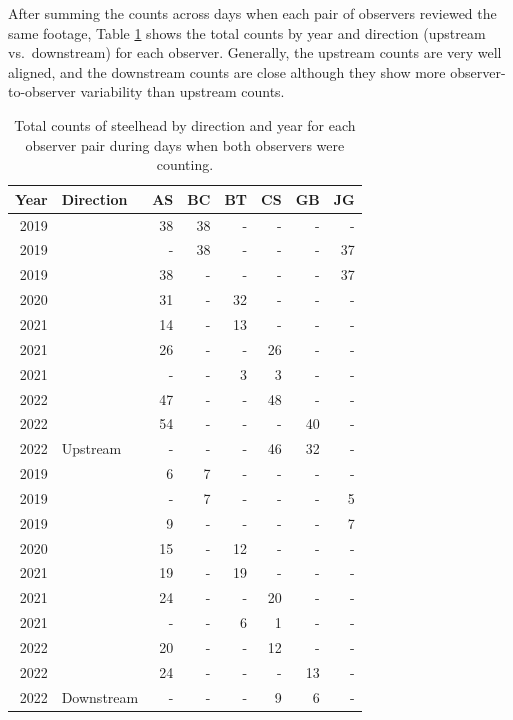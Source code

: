 \documentclass[
]{article}
\begin{document}
After summing the counts across days when each pair of observers reviewed the same footage, Table \ref{tab:obs-totals} shows the total counts by year and direction (upstream vs.~downstream) for each observer. Generally, the upstream counts are very well aligned, and the downstream counts are close although they show more observer-to-observer variability than upstream counts.

\begin{table}[!h]

\caption{\label{tab:obs-totals}Total counts of steelhead by direction and year for each observer pair during days when both observers were counting.}
\centering
\begin{tabular}[t]{rlrrrrrr}
\toprule
Year & Direction & AS & BC & BT & CS & GB & JG\\
\midrule
2019 &  & 38 & 38 & - & - & - & -\\
\cmidrule{1-1}
\cmidrule{3-8}
2019 &  & - & 38 & - & - & - & 37\\
\cmidrule{1-1}
\cmidrule{3-8}
2019 &  & 38 & - & - & - & - & 37\\
\cmidrule{1-1}
\cmidrule{3-8}
2020 &  & 31 & - & 32 & - & - & -\\
\cmidrule{1-1}
\cmidrule{3-8}
2021 &  & 14 & - & 13 & - & - & -\\
\cmidrule{1-1}
\cmidrule{3-8}
2021 &  & 26 & - & - & 26 & - & -\\
\cmidrule{1-1}
\cmidrule{3-8}
2021 &  & - & - & 3 & 3 & - & -\\
\cmidrule{1-1}
\cmidrule{3-8}
2022 &  & 47 & - & - & 48 & - & -\\
\cmidrule{1-1}
\cmidrule{3-8}
2022 &  & 54 & - & - & - & 40 & -\\
\cmidrule{1-1}
\cmidrule{3-8}
2022 & \multirow{-10}{*}{\raggedright\arraybackslash Upstream} & - & - & - & 46 & 32 & -\\
\cmidrule{1-8}
\midrule
2019 &  & 6 & 7 & - & - & - & -\\
\cmidrule{1-1}
\cmidrule{3-8}
2019 &  & - & 7 & - & - & - & 5\\
\cmidrule{1-1}
\cmidrule{3-8}
2019 &  & 9 & - & - & - & - & 7\\
\cmidrule{1-1}
\cmidrule{3-8}
2020 &  & 15 & - & 12 & - & - & -\\
\cmidrule{1-1}
\cmidrule{3-8}
2021 &  & 19 & - & 19 & - & - & -\\
\cmidrule{1-1}
\cmidrule{3-8}
2021 &  & 24 & - & - & 20 & - & -\\
\cmidrule{1-1}
\cmidrule{3-8}
2021 &  & - & - & 6 & 1 & - & -\\
\cmidrule{1-1}
\cmidrule{3-8}
2022 &  & 20 & - & - & 12 & - & -\\
\cmidrule{1-1}
\cmidrule{3-8}
2022 &  & 24 & - & - & - & 13 & -\\
\cmidrule{1-1}
\cmidrule{3-8}
2022 & \multirow{-10}{*}{\raggedright\arraybackslash Downstream} & - & - & - & 9 & 6 & -\\
\bottomrule
\end{tabular}
\end{table}
\end{document}
